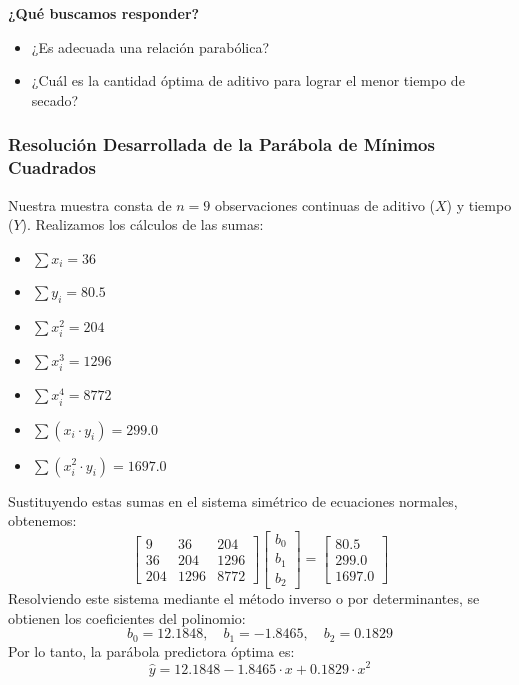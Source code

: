 \documentclass[11pt,a4paper]{article}
\begin{document}
    \textbf{¿Qué buscamos responder?}
    \begin{itemize}
        \item ¿Es adecuada una relación parabólica?
        \item ¿Cuál es la cantidad óptima de aditivo para lograr el menor tiempo de secado?
    \end{itemize}

    \subsubsection*{Resolución Desarrollada de la Parábola de Mínimos Cuadrados}
    Nuestra muestra consta de $n = 9$ observaciones continuas de aditivo ($X$) y tiempo ($Y$). Realizamos los cálculos de las sumas:
    \begin{itemize}
        \item $\sum x_i = 36$
        \item $\sum y_i = 80.5$
        \item $\sum x_i^2 = 204$
        \item $\sum x_i^3 = 1296$
        \item $\sum x_i^4 = 8772$
        \item $\sum (x_i \cdot y_i) = 299.0$
        \item $\sum (x_i^2 \cdot y_i) = 1697.0$
    \end{itemize}
    Sustituyendo estas sumas en el sistema simétrico de ecuaciones normales, obtenemos:
    \[ \begin{bmatrix} 9 & 36 & 204 \\ 36 & 204 & 1296 \\ 204 & 1296 & 8772 \end{bmatrix} \begin{bmatrix} b_0 \\ b_1 \\ b_2 \end{bmatrix} = \begin{bmatrix} 80.5 \\ 299.0 \\ 1697.0 \end{bmatrix} \]
    Resolviendo este sistema mediante el método inverso o por determinantes, se obtienen los coeficientes del polinomio:
    \begin{equation}
        b_0 = \mathbf{12.1848}, \quad b_1 = \mathbf{-1.8465}, \quad b_2 = \mathbf{0.1829}
    \end{equation}
    Por lo tanto, la parábola predictora óptima es:
    \[ \hat{y} = 12.1848 - 1.8465 \cdot x + 0.1829 \cdot x^2 \]
\end{document}
